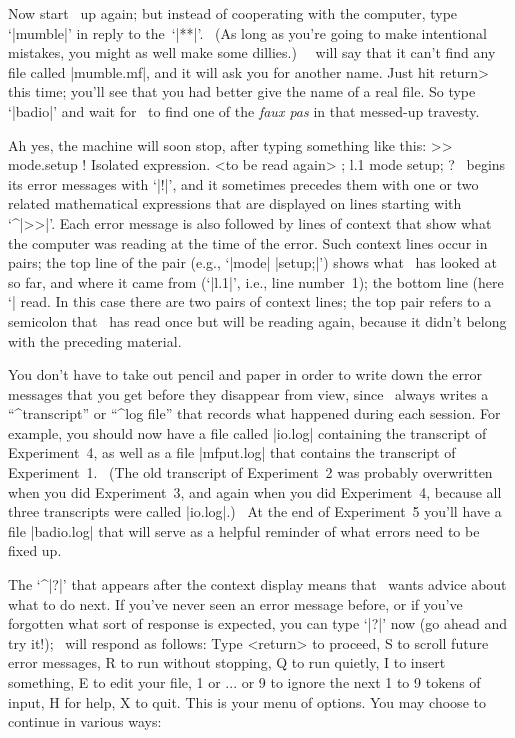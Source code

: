 Now start \MF\ up again; but instead of cooperating with the computer, type
`|mumble|' in reply to the~`|**|'. \ (As long as you're going to make
intentional mistakes, you might as well make some dillies.) \
\MF\ will say that it can't find any file called |mumble.mf|,
and it will ask you for another name. Just hit \<return> this time;
you'll see that you had better give the name of a real file.
So type `|badio|' and wait for \MF\ to find one of the {\sl faux pas\/}
in that messed-up travesty.

Ah yes, the machine will soon stop, after typing something like this:
\begintt
>> mode.setup
! Isolated expression.
<to be read again>
                   ;
l.1 mode setup;
?
\endtt
\MF\ begins its error messages with `|!|', and it sometimes precedes them
with one or two related mathematical expressions that are displayed on
lines starting with `^|>>|'.  Each error message is also followed by lines
of context that show what the computer was reading at the time of the
error. Such context lines occur in pairs; the top line of the pair (e.g.,
`|mode| |setup;|'\thinspace) shows what \MF\ has looked at so far, and
where it came from (`|l.1|', i.e., line number~1); the bottom line (here
`|%
read. In this case there are two pairs of context lines; the top pair
refers to a semicolon that \MF\ has read once but will be reading again,
because it didn't belong with the preceding material.

You don't have to take out pencil and paper in order to write down the
error messages that you get before they disappear from view, since \MF\
always writes a ``^{transcript}'' or ``^{log file}'' that records what
happened during each session. For example, you should now have a file
called |io.log| containing the transcript of Experiment~4, as well as a file
|mfput.log| that contains the transcript of Experiment~1. \ (The old
transcript of Experiment~2 was probably overwritten when you did
Experiment~3, and again when you did Experiment~4, because all three
transcripts were called |io.log|.) \ At the end of Experiment~5 you'll
have a file |badio.log| that will serve as a helpful reminder of
what errors need to be fixed up.

The `^|?|' that appears after the context display means that \MF\ wants
advice about what to do next. If you've never seen an error message before,
or if you've forgotten what sort of response is expected, you can type
`|?|' now (go ahead and try it!); \MF\ will respond as follows:
\begintt
Type <return> to proceed, S to scroll future error messages,
R to run without stopping, Q to run quietly,
I to insert something, E to edit your file,
1 or ... or 9 to ignore the next 1 to 9 tokens of input,
H for help, X to quit.
\endtt
This is your menu of options. You may choose to continue in various ways:

